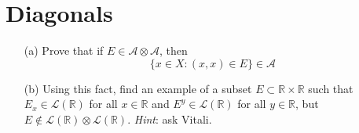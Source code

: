 \documentclass[lang=cn,11pt]{elegantbook}
\begin{document}
\section{Diagonals}
  \begin{itemize}
  \item[(a)]Prove that if $E\in\mathcal{A}\otimes\mathcal{A}$, then  \[
      \{ x\in X: (x,x)\in E\} \in \mathcal{A}
    \]
  \item[(b)]Using this fact, find an example of a subset $E\subset \mathbb{R}\times \mathbb{R}$ such that $E_x\in \mathcal{L}(\mathbb{R})$ for all $x\in \mathbb{R}$ and $E^y\in \mathcal{L}(\mathbb{R})$ for all $y\in \mathbb{R}$, but $E\notin \mathcal{L}(\mathbb{R})\otimes  \mathcal{L}(\mathbb{R})$.
    \textit{Hint}: ask Vitali.
  \end{itemize}
\end{document}
